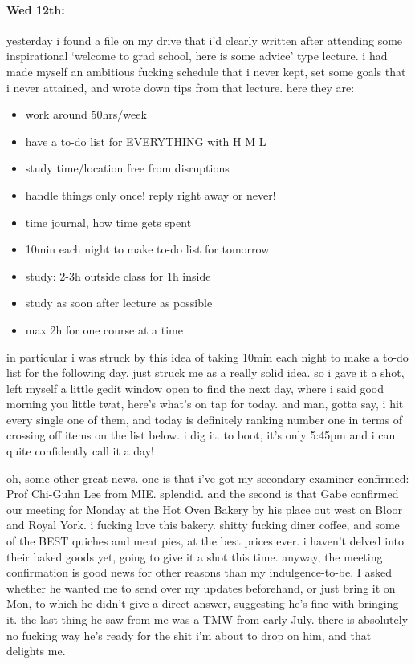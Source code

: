 \documentclass[12pt]{article}
\begin{document}
\paragraph{Wed 12th:} yesterday i found a file on my drive that i'd clearly written after attending some inspirational `welcome to grad school, here is some advice' type lecture. i had made myself an ambitious fucking schedule that i never kept, set some goals that i never attained, and wrote down tips from that lecture. here they are:
\begin{itemize}[topsep=0pt,itemsep=0ex,partopsep=0ex,parsep=0ex]
\item work around 50hrs/week
\item have a to-do list for EVERYTHING with H M L
\item study time/location free from disruptions
\item handle things only once! reply right away or never!
\item time journal, how time gets spent
\item 10min each night to make to-do list for tomorrow
\item study: 2-3h outside class for 1h inside
\item study as soon after lecture as possible
\item max 2h for one course at a time
\end{itemize}
in particular i was struck by this idea of taking 10min each night to make a to-do list for the following day. just struck me as a really solid idea. so i gave it a shot, left myself a little gedit window open to find the next day, where i said good morning you little twat, here's what's on tap for today. and man, gotta say, i hit every single one of them, and today is definitely ranking number one in terms of crossing off items on the list below. i dig it. to boot, it's only 5:45pm and i can quite confidently call it a day! \par
oh, some other great news. one is that i've got my secondary examiner confirmed: Prof Chi-Guhn Lee from MIE. splendid. and the second is that Gabe confirmed our meeting for Monday at the Hot Oven Bakery by his place out west on Bloor and Royal York. i fucking love this bakery. shitty fucking diner coffee, and some of the BEST quiches and meat pies, at the best prices ever. i haven't delved into their baked goods yet, going to give it a shot this time. anyway, the meeting confirmation is good news for other reasons than my indulgence-to-be. I asked whether he wanted me to send over my updates beforehand, or just bring it on Mon, to which he didn't give a direct answer, suggesting he's fine with bringing it. the last thing he saw from me was a TMW from early July. there is absolutely no fucking way he's ready for the shit i'm about to drop on him, and that delights me.
\end{document}
